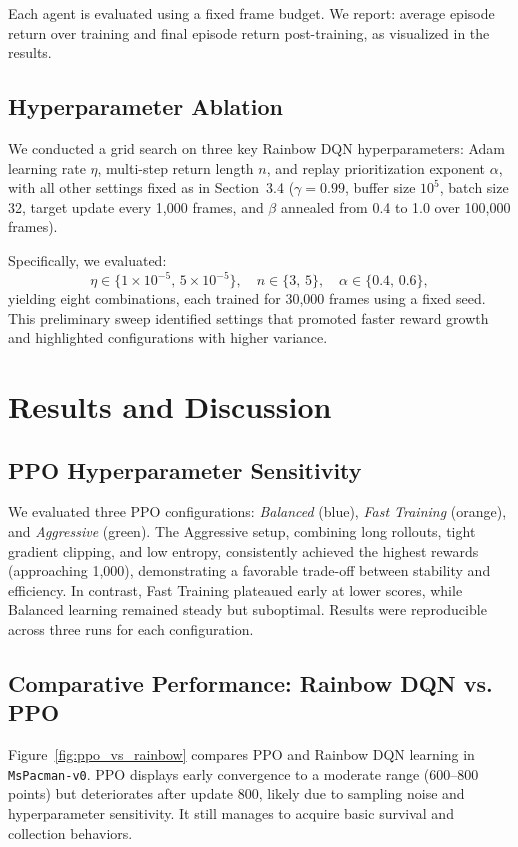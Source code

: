 \documentclass{article}
\begin{document}
Each agent is evaluated using a fixed frame budget. We report:
average episode return over training and final episode return post-training, as visualized in the results.

\subsection{Hyperparameter Ablation}

We conducted a grid search on three key Rainbow DQN hyperparameters: Adam learning rate $\eta$, multi-step return length $n$, and replay prioritization exponent $\alpha$, with all other settings fixed as in Section~3.4 ($\gamma=0.99$, buffer size $10^5$, batch size 32, target update every 1,000 frames, and $\beta$ annealed from 0.4 to 1.0 over 100,000 frames).

Specifically, we evaluated:
\[
\eta \in \{1\times10^{-5},\,5\times10^{-5}\},\quad
n \in \{3,\,5\},\quad
\alpha \in \{0.4,\,0.6\},
\]
yielding eight combinations, each trained for 30,000 frames using a fixed seed. This preliminary sweep identified settings that promoted faster reward growth and highlighted configurations with higher variance.

\section{Results and Discussion}

\subsection{PPO Hyperparameter Sensitivity}

We evaluated three PPO configurations: \textit{Balanced} (blue), \textit{Fast Training} (orange), and \textit{Aggressive} (green). The Aggressive setup, combining long rollouts, tight gradient clipping, and low entropy, consistently achieved the highest rewards (approaching 1,000), demonstrating a favorable trade-off between stability and efficiency. In contrast, Fast Training plateaued early at lower scores, while Balanced learning remained steady but suboptimal. Results were reproducible across three runs for each configuration.

\subsection{Comparative Performance: Rainbow DQN vs. PPO}

Figure~\ref{fig:ppo_vs_rainbow} compares PPO and Rainbow DQN learning in \texttt{MsPacman-v0}. PPO displays early convergence to a moderate range (600–800 points) but deteriorates after update 800, likely due to sampling noise and hyperparameter sensitivity. It still manages to acquire basic survival and collection behaviors.
\end{document}
